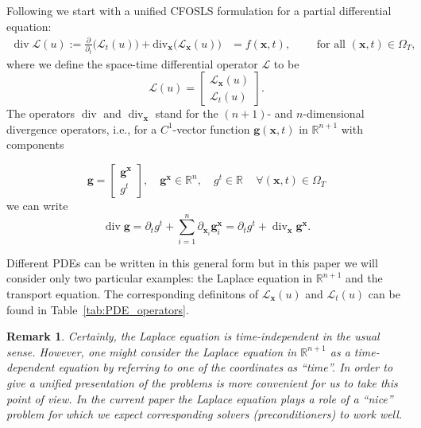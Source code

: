 \documentclass[a4paper,12pt]{amsart}
\numberwithin{equation}{section}
\newtheorem{remark}{Remark}[section]
\renewcommand{\div}{\operatorname{div}}
\renewcommand{\L}{{\mathcal L}}
\def\XVec#1{{\mathbf #1}}
\def\Xx{\XVec{x}}
\begin{document}
Following \cite{our_paper_cfosls} we start with a unified CFOSLS formulation for a partial differential equation:
\begin{align} \label{Problem}
\div \L(u) := \frac{\partial}{\partial_t} \big(\L_t(u) \big)+ \mathrm{div}_\Xx \big( \L_\Xx (u)\big)& = f(\Xx, t), \qquad \text{ for all } (\Xx,t) \in \Omega_T,
\end{align}
where we define the space-time differential operator $\L$ to be
\[
\L(u) =  \begin{bmatrix} \L_\Xx(u) \\ \L_t(u) \end{bmatrix}.
\]
The operators $\div$ and $\div_\Xx$ stand for the $(n+1)$- and $n$-dimensional divergence operators, i.e., for a $C^1$-vector function $\mathbf{g}(\Xx,t)$ in $\mathbb{R}^{n+1}$ with components

$$
\mathbf{g} =  \begin{bmatrix} \mathbf{g}^\Xx 
\\ g^t \end{bmatrix}, \quad 
\mathbf{g}^\Xx \in \mathbb{R}^{n}, \quad g^t \in \mathbb{R} \quad \, \forall (\Xx,t) \in \Omega_T
$$
we can write
$$
\div \mathbf{g} = \partial_t g^t + \sum_{i = 1}^{n} \partial_{\Xx_i} \mathbf{g}^{\Xx}_i = \partial_t g^t + \div_\Xx \mathbf{g}^{\Xx}.
$$

Different PDEs can be written in this general form but in this paper we will consider only two particular examples: the Laplace equation in $\mathbb{R}^{n+1}$ and the transport equation. The corresponding definitons of $\L_\Xx(u)$ and $\L_t(u)$ can be found  in Table~\ref{tab:PDE_operators}.

\begin{remark}
Certainly, the Laplace equation is time-independent in the usual sense. However, one might consider the Laplace equation in $\mathbb{R}^{n+1}$ as a time-dependent equation by referring to one of the coordinates as ``time''. In order to give a unified presentation of the problems is more convenient for us to take this point of view. In the current paper the Laplace equation plays a role of a ``nice'' problem for which we expect corresponding solvers (preconditioners) to work well.
\end{remark}
\end{document}
